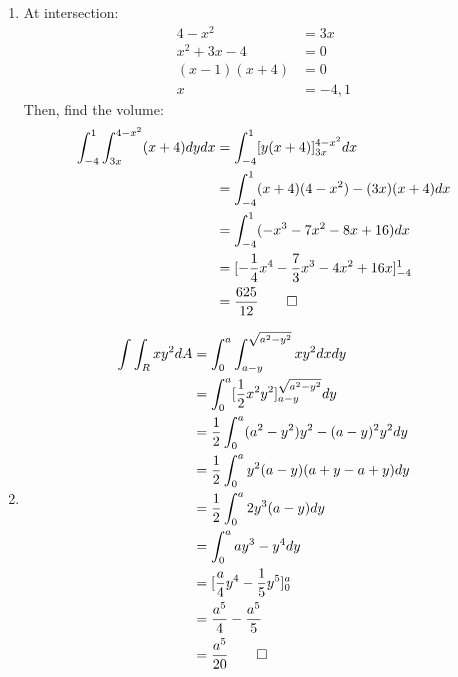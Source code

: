 \documentclass[12pt, a4paper]{article}
\begin{document}
\begin{enumerate}[Q\arabic*.]
  \item At intersection:
    \begin{align*}
      4-x^2 &= 3x\\
      x^2+3x-4 &= 0\\
      (x-1)(x+4) &= 0\\
      x &= -4,1
    \end{align*}
    Then, find the volume:
    \begin{align*}
      \int^1_{-4}\int^{4-x^2}_{3x}(x+4)dydx &= \int^1_{-4}[y(x+4)]^{4-x^2}_{3x}dx\\
                                            &= \int^1_{-4}(x+4)(4-x^2)-(3x)(x+4)dx\\
                                            &= \int^1_{-4}(-x^3-7x^2-8x+16)dx\\
                                            &= [-\frac{1}{4}x^4 -\frac{7}{3}x^3-4x^2+16x]^1_{-4}\\
                                            &= \frac{625}{12}\qed
    \end{align*}

  \item 
    \begin{align*}
      \int\int_R xy^2 dA &= \int^a_0\int^{\sqrt{a^2-y^2}}_{a-y} xy^2 dx dy\\
                         &= \int^a_0 [\frac{1}{2}x^2y^2]^{\sqrt{a^2-y^2}}_{a-y}dy\\
                         &= \frac{1}{2}\int^a_0(a^2-y^2)y^2-(a-y)^2y^2dy\\
                         &= \frac{1}{2}\int^a_0 y^2(a-y)(a+y-a+y)dy\\
                         &= \frac{1}{2}\int^a_0 2y^3(a-y)dy\\
                         &= \int^a_0 ay^3-y^4 dy\\
                         &= [\frac{a}{4}y^4-\frac{1}{5}y^5]^a_0\\
                         &= \frac{a^5}{4}-\frac{a^5}{5}\\
                         &= \frac{a^5}{20}\qed
    \end{align*}


\end{enumerate}
\end{document}
